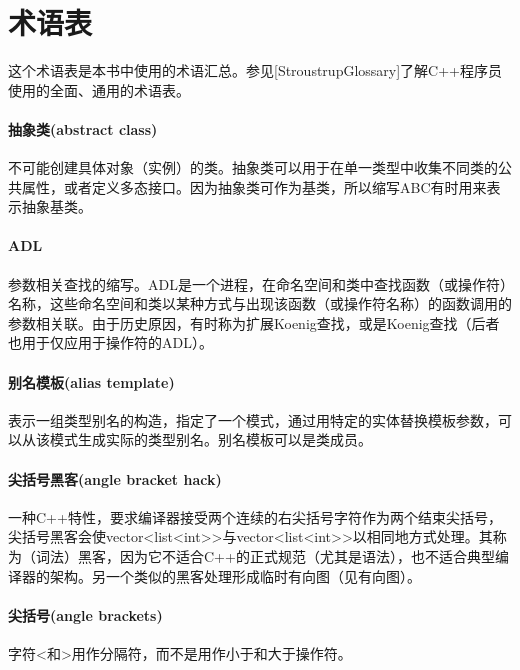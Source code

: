 \chapter{术语表}

这个术语表是本书中使用的术语汇总。参见[StroustrupGlossary]了解C++程序员使用的全面、通用的术语表。

\subsubsection{抽象类(abstract class)}

不可能创建具体对象（实例）的类。抽象类可以用于在单一类型中收集不同类的公共属性，或者定义多态接口。因为抽象类可作为基类，所以缩写ABC有时用来表示抽象基类。

\subsubsection{ADL}

参数相关查找的缩写。ADL是一个进程，在命名空间和类中查找函数（或操作符）名称，这些命名空间和类以某种方式与出现该函数（或操作符名称）的函数调用的参数相关联。由于历史原因，有时称为扩展Koenig查找，或是Koenig查找（后者也用于仅应用于操作符的ADL）。

\subsubsection{别名模板(alias template)}  

表示一组类型别名的构造，指定了一个模式，通过用特定的实体替换模板参数，可以从该模式生成实际的类型别名。别名模板可以是类成员。

\subsubsection{尖括号黑客(angle bracket hack)}

一种C++特性，要求编译器接受两个连续的右尖括号字符作为两个结束尖括号，尖括号黑客会使vector<list<int>{}>与vector<list<int>{}>以相同地方式处理。其称为（词法）黑客，因为它不适合C++的正式规范（尤其是语法），也不适合典型编译器的架构。另一个类似的黑客处理形成临时有向图（见有向图）。

\subsubsection{尖括号(angle brackets)}

字符<和>用作分隔符，而不是用作小于和大于操作符。

